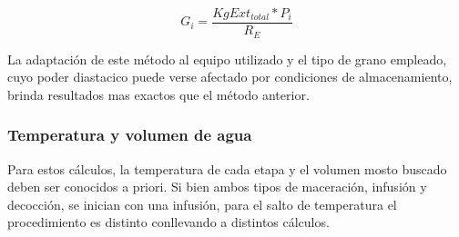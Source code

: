 \begin{itemize}
                    \begin{equation}
                        G_{i} = \frac{KgExt_{total} * P_{i}}{R_E}
                        \label{EcuacionCantidadGranoEmpirico}
                    \end{equation}
                    
                    \par La adaptación de este método al equipo utilizado y el tipo de grano empleado, cuyo poder diastacico puede verse afectado por condiciones de almacenamiento, brinda resultados mas exactos que el método anterior.
                \end{itemize}
                
            \subsubsection{Temperatura y volumen de agua}
            \par Para estos cálculos, la temperatura de cada etapa y el volumen mosto buscado deben ser conocidos a priori. Si bien ambos tipos de maceración, infusión y decocción, se inician con una infusión, para el salto de temperatura el procedimiento es distinto conllevando a distintos cálculos.
            
